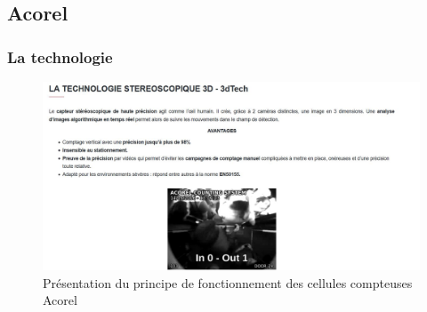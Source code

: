 \documentclass{article}
\begin{document}
    \pagebreak
    \subsection{Acorel}

        \subsubsection{La technologie}

            \label{Acorel_techno}
            \begin{figure}[!h]
                \centering
                \includegraphics[scale = 0.5]{Images/Acorel_3d_tech.JPG}
                \caption{Présentation du principe de fonctionnement des cellules compteuses Acorel}
            \end{figure}

        \pagebreak
\end{document}

